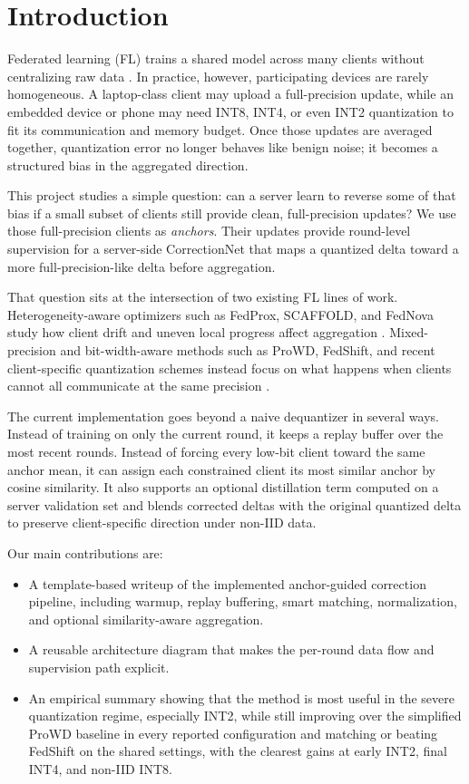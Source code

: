 \section{Introduction}

Federated learning (FL) trains a shared model across many clients without
centralizing raw data \citep{mcmahan2017}. In practice, however, participating
devices are rarely homogeneous. A laptop-class client may upload a
full-precision update, while an embedded device or phone may need INT8, INT4,
or even INT2 quantization to fit its communication and memory budget. Once
those updates are averaged together, quantization error no longer behaves like
benign noise; it becomes a structured bias in the aggregated direction.

This project studies a simple question: can a server learn to reverse some of
that bias if a small subset of clients still provide clean, full-precision
updates? We use those full-precision clients as \emph{anchors}. Their updates
provide round-level supervision for a server-side CorrectionNet that maps a
quantized delta toward a more full-precision-like delta before aggregation.

That question sits at the intersection of two existing FL lines of work.
Heterogeneity-aware optimizers such as FedProx, SCAFFOLD, and FedNova study how
client drift and uneven local progress affect aggregation
\citep{li2020fedprox,karimireddy2020scaffold,wang2020fednova}. Mixed-precision
and bit-width-aware methods such as ProWD, FedShift, and recent client-specific
quantization schemes instead focus on what happens when clients cannot all
communicate at the same precision
\citep{yoon2022prowd,seo2024fedshift,chen2024fedmpq}.

The current implementation goes beyond a naive dequantizer in several ways.
Instead of training on only the current round, it keeps a replay buffer over the
most recent rounds. Instead of forcing every low-bit client toward the same
anchor mean, it can assign each constrained client its most similar anchor by
cosine similarity. It also supports an optional distillation term computed on a
server validation set and blends corrected deltas with the original quantized
delta to preserve client-specific direction under non-IID data.

Our main contributions are:
\begin{itemize}[leftmargin=*]
  \item A template-based writeup of the implemented anchor-guided correction
  pipeline, including warmup, replay buffering, smart matching, normalization,
  and optional similarity-aware aggregation.
  \item A reusable architecture diagram that makes the per-round data flow and
  supervision path explicit.
  \item An empirical summary showing that the method is most useful in the
  severe quantization regime, especially INT2, while still improving over the
  simplified ProWD baseline in every reported configuration and matching or
  beating FedShift on the shared settings, with the clearest gains at early
  INT2, final INT4, and non-IID INT8.
\end{itemize}
